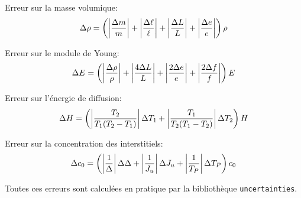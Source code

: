Erreur sur la masse volumique:
\begin{equation}
    \Delta \rho = \left(\left|\frac{\Delta m}{m}\right| + \left|\frac{\Delta \ell}{\ell}\right| + \left|\frac{\Delta L}{L}\right| + \left|\frac{\Delta e}{e}\right|\right) \rho
\end{equation}

Erreur sur le module de Young:
\begin{equation}
    \Delta E = \left(\left|\frac{\Delta \rho}{\rho}\right| + \left|\frac{4\Delta L}{L}\right| + \left|\frac{2\Delta e}{e}\right| + \left|\frac{2\Delta f}{f}\right| \right) E
\end{equation}

Erreur sur l'énergie de diffusion:
\begin{equation}
    \Delta H = \left(\left|\frac{T_2}{T_1(T_2-T_1)}\right|\Delta T_1 + \left|\frac{T_1}{T_2(T_1-T_2)}\right|\Delta T_2\right)H
\end{equation}

Erreur sur la concentration des interstitiels:
\begin{equation}
    \Delta c_0 = \left(\left|\frac{1}{\Delta}\right|\Delta \Delta + \left|\frac{1}{J_u}\right|\Delta J_u + \left|\frac{1}{T_P}\right| \Delta T_P\right)c_0
\end{equation}

Toutes ces erreurs sont calculées en pratique par la bibliothèque \texttt{uncertainties}.
